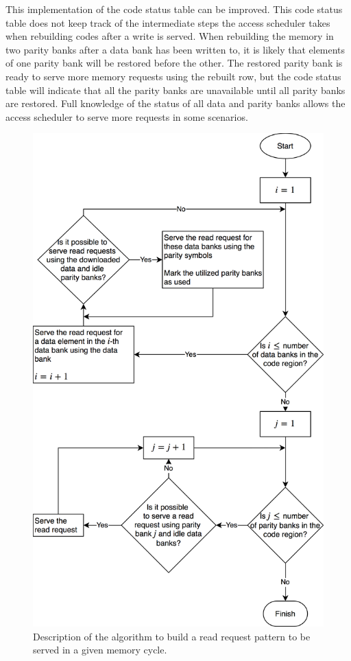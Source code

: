 {\color{red}
This implementation of the code status table can be improved. This code status table does not keep track of the intermediate steps the access scheduler takes when rebuilding codes after a write is served. When rebuilding the memory in two parity banks after a data bank has been written to, it is likely that elements of one parity bank will be restored before the other. The restored parity bank is ready to serve more memory requests using the rebuilt row, but the code status table will indicate that all the parity banks are unavailable until all parity banks are restored. Full knowledge of the status of all data and parity banks allows the access scheduler to serve more requests in some scenarios. 
}

\begin{figure}[t!]
	\includegraphics[width=0.96\linewidth]{fig/read_pattern_algo.png}
	\caption{{Description of the algorithm to build a read request pattern to be served in a given memory cycle.}}
	\label{fig:readAlgo}
\end{figure}

